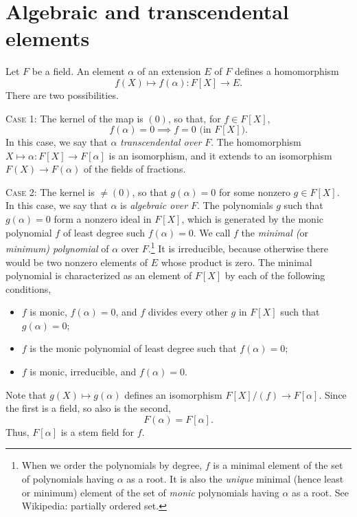 \documentclass[a4paper,11pt,final,openany]{memoir}
\theoremstyle{nonumberplain}
\begin{document}
\section{Algebraic and transcendental elements}

Let $F$ be a field. An element $\alpha$ of an extension $E$ of $F$ defines a
homomorphism
\[
f(X)\mapsto f(\alpha)\colon F[X]\rightarrow E.
\]
There are two possibilities.

\textsc{Case 1:\/} The kernel of the map is $(0)$, so that, for $f\in F[X]$,
\[
f(\alpha)=0\implies f=0\text{ (in }F[X]\text{).}%
\]
In this case, we say that $\alpha$ \emph{transcendental over }%
%
$F$. The homomorphism $X\mapsto\alpha\colon F[X]\rightarrow F[\alpha]$ is an
isomorphism, and it extends to an isomorphism $F(X)\rightarrow F(\alpha)$ of
the fields of fractions.

\textsc{Case 2:\/} The kernel is $\neq(0)$, so that $g(\alpha)=0$ for some
nonzero $g\in F[X]$. In this case, we say that $\alpha$ is \emph{algebraic
over }$F$.%
The polynomials $g$ such that $g(\alpha)=0$ form a nonzero ideal in $F[X]$,
which is generated by the monic polynomial $f$ of least degree such
$f(\alpha)=0$. We call $f$ the \emph{minimal (}or \emph{minimum) polynomial\/}%
%
%
\label{minimal} of $\alpha$ over $F$.\footnote{When we order the polynomials
by degree, $f$ is a minimal element of the set of polynomials having $\alpha$
as a root. It is also the \textit{unique} minimal (hence least or minimum)
element of the set of \textit{monic} polynomials having $\alpha$ as a root.
See Wikipedia: partially ordered set.} It is irreducible, because otherwise
there would be two nonzero elements of $E$ whose product is zero. The minimal
polynomial is characterized as an element of $F[X]$ by each of the following conditions,

\begin{itemize}
\item $f$ is monic, $f(\alpha)=0$, and $f$ divides every other $g$ in $F[X]$
such that $g(\alpha)=0$;

\item $f$ is the monic polynomial of least degree such that $f(\alpha)=0;$

\item $f$ is monic, irreducible, and $f(\alpha)=0$.
\end{itemize}

\noindent Note that $g(X)\mapsto g(\alpha)$ defines an isomorphism
$F[X]/(f)\rightarrow F[\alpha]$. Since the first is a field\label{field}, so
also is the second,
\[
F(\alpha)=F[\alpha].
\]
Thus, $F[\alpha]$ is a stem field for $f$.
\end{document}
